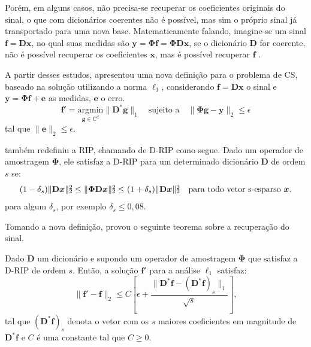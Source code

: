 \documentclass[cic,tc]{iiufrgs}
\def\SPSB#1#2{\rlap{\textsuperscript{#1}}\SB{#2}}
\def\SB#1{\textsubscript{#1}}
\renewcommand{\vec}[1]{\bm{#1}}
\begin{document}
Porém, em alguns casos, não precisa-se recuperar os coeficientes originais do sinal, o que com dicionários 
coerentes não é possível, mas sim o próprio sinal já transportado para uma nova base.
Matematicamente falando, imagine-se um sinal $\vec{f} = \mathbf{D}\vec{x}$, no qual suas medidas são
$\vec{y} = \mathbf{\Phi}\vec{f} = \mathbf{\Phi}\mathbf{D}\vec{x}$, se o dicionário $\mathbf{D}$ for
coerente, não é possível recuperar os coeficientes $\vec{x}$, mas é possível recuperar $\vec{f}$ \cite{CANDESDICTS}.

A partir desses estudos, \citet{CANDESDICTS} apresentou uma nova definição para o problema de CS, 
baseado na solução utilizando a norma $\ell_1$, considerando $\vec{f} = \mathbf{D}\vec{x}$ o sinal
e $\vec{y} = \mathbf{\Phi}\vec{f} + \vec{e}$ as medidas, $\vec{e}$ o erro.
\begin{equation}
    \label{eq:problemDl1}
    \vec{f'} = \underset{\vec{g} \in \mathbb{C}^d}{\text{argmin}} \lVert \mathbf{D}^*\vec{g} \rVert_1 
    \hspace{1em} \text{sujeito a} \hspace{1em}
    \lVert \mathbf{\Phi} \vec{g} - \vec{y} \rVert_2 \le \epsilon
\end{equation}
tal que $\lVert \vec{e} \rVert_2 \le \epsilon $.

\citet{CANDESDICTS} também redefiniu a RIP, chamando de D-RIP como segue. 
Dado um operador de amostragem $\mathbf{\Phi}$, ele satisfaz a D-RIP para um determinado 
dicionário $\mathbf{D}$ de ordem $s$ se:
\begin{equation}
    (1 - \delta_s)\lVert \mathbf{D}\vec{x} \rVert\SPSB{2}{2} \le \lVert \mathbf{\Phi} \mathbf{D}\vec{x} \rVert \SPSB{2}{2} \le 
    (1 + \delta_s)\lVert \mathbf{D}\vec{x} \rVert\SPSB{2}{2} \hspace{1em} \text{para todo vetor s-esparso } \vec{x}.
\end{equation}
para algum $\delta_s$, por exemplo $\delta_s \le 0,08$.

Tomando a nova definição, \citet{CANDESDICTS} provou o seguinte teorema sobre a recuperação do sinal.
\begin{teorema}
    \cite{CANDESDICTS}
    Dado $\mathbf{D}$ um dicionário e supondo um operador de amostragem $\mathbf{\Phi}$ que satisfaz
    a D-RIP de ordem $s$.
    Então, a solução $\vec{f'}$ para a análise $\ell_1$ satisfaz:
    \begin{equation*}
        \lVert \vec{f'} - \vec{f} \rVert_2 \le C \left[ \epsilon + \frac{\lVert \mathbf{D}^* \vec{f} - \left( \mathbf{D}^* \vec{f} \right)_s \rVert_1}{\sqrt{s}} \right],
    \end{equation*}
    tal que $\left( \mathbf{D}^* \vec{f} \right)_s$ denota o vetor com os $s$ maiores coeficientes em 
    magnitude de $\mathbf{D}^* \vec{f}$ e $C$ é uma constante tal que $C \ge 0$.
\end{teorema}
\end{document}

